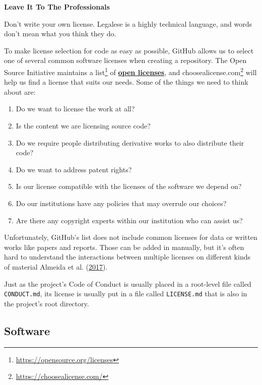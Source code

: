 \documentclass[
]{krantz}
\providecommand{\tightlist}{%
  \setlength{\itemsep}{0pt}\setlength{\parskip}{0pt}}
\renewenvironment{quote}{\begin{VF}}{\end{VF}}
\renewcommand{\href}[2]{#2\footnote{\url{#1}}}
\newcommand{\gref}[2]{\hyperlink{#2}{\textbf{#1}}}
\begin{document}
\begin{quote}
\textbf{Leave It To The Professionals}

Don't write your own license.
Legalese is a highly technical language,
and words don't mean what you think they do.
\end{quote}

To make license selection for code as easy as possible,
GitHub allows us to select one of several common software licenses when creating a repository.
The Open Source Initiative maintains \href{https://opensource.org/licenses}{a list} of \gref{open licenses}{open\_license},
and \href{https://choosealicense.com/}{choosealicense.com} will help us find a license that suits our needs.
Some of the things we need to think about are:

\begin{enumerate}
\def\labelenumi{\arabic{enumi}.}
\tightlist
\item
  Do we want to license the work at all?
\item
  Is the content we are licensing source code?
\item
  Do we require people distributing derivative works to also distribute their code?
\item
  Do we want to address patent rights?
\item
  Is our license compatible with the licenses of the software we depend on?
\item
  Do our institutions have any policies that may overrule our choices?
\item
  Are there any copyright experts within our institution who can assist us?
\end{enumerate}

Unfortunately,
GitHub's list does not include common licenses for data or written works like papers and reports.
Those can be added in manually,
but it's often hard to understand the interactions between multiple licenses
on different kinds of material Almeida et al. (\protect\hyperlink{ref-Alme2017}{2017}).

Just as the project's Code of Conduct is usually placed in a root-level file called \texttt{CONDUCT.md},
its license is usually put in a file called \texttt{LICENSE.md}
that is also in the project's root directory.

\hypertarget{teams-license-software}{%
\subsection{Software}\label{teams-license-software}}
\end{document}
